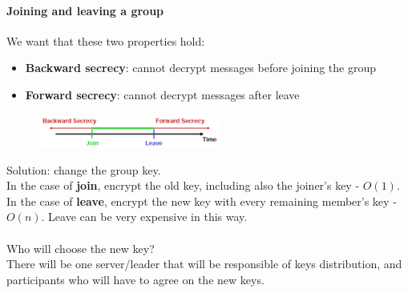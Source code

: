 \documentclass[10pt,a4paper]{article}
\begin{document}
\paragraph{Joining and leaving a group}
We want that these two properties hold:
\begin{itemize}
	\item \textbf{Backward secrecy}: cannot decrypt messages before joining the group
	\item \textbf{Forward secrecy}: cannot decrypt messages after leave
\end{itemize}
\begin{figure}[h!]\hfill \includegraphics[width=170pt]{images/secrecy.png}\hspace*{\fill}
  \label{fig:secrecy}
\end{figure}
Solution: change the group key. \\
In the case of \textbf{join}, encrypt the old key, including also the joiner's key - $O(1)$. \\
In the case of \textbf{leave}, encrypt the new key with every remaining member's key - $O(n)$. Leave can be very expensive in this way. \\ \\
Who will choose the new key? \\ There will be one server/leader that will be responsible of keys distribution, and participants who will have to agree on the new keys.
\end{document}
